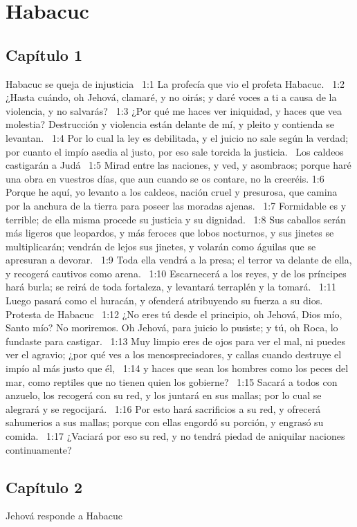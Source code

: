 \chapter{Habacuc}
\section*{Capítulo 1 }
Habacuc se queja de injusticia  
1:1 La profecía que vio el profeta Habacuc.  
1:2 ¿Hasta cuándo, oh Jehová, clamaré, y no oirás; y daré voces a ti a causa de la violencia, y no salvarás?  
1:3 ¿Por qué me haces ver iniquidad, y haces que vea molestia? Destrucción y violencia están delante de mí, y pleito y contienda se levantan.  
1:4 Por lo cual la ley es debilitada, y el juicio no sale según la verdad; por cuanto el impío asedia al justo, por eso sale torcida la justicia.  
Los caldeos castigarán a Judá  
1:5 Mirad entre las naciones, y ved, y asombraos; porque haré una obra en vuestros días, que aun cuando se os contare, no la creeréis. 
1:6 Porque he aquí, yo levanto a los caldeos, nación cruel y presurosa, que camina por la anchura de la tierra para poseer las moradas ajenas.  
1:7 Formidable es y terrible; de ella misma procede su justicia y su dignidad.  
1:8 Sus caballos serán más ligeros que leopardos, y más feroces que lobos nocturnos, y sus jinetes se multiplicarán; vendrán de lejos sus jinetes, y volarán como águilas que se apresuran a devorar.  
1:9 Toda ella vendrá a la presa; el terror va delante de ella, y recogerá cautivos como arena.  
1:10 Escarnecerá a los reyes, y de los príncipes hará burla; se reirá de toda fortaleza, y levantará terraplén y la tomará.  
1:11 Luego pasará como el huracán, y ofenderá atribuyendo su fuerza a su dios.  
Protesta de Habacuc  
1:12 ¿No eres tú desde el principio, oh Jehová, Dios mío, Santo mío? No moriremos. Oh Jehová, para juicio lo pusiste; y tú, oh Roca, lo fundaste para castigar.  
1:13 Muy limpio eres de ojos para ver el mal, ni puedes ver el agravio; ¿por qué ves a los menospreciadores, y callas cuando destruye el impío al más justo que él,  
1:14 y haces que sean los hombres como los peces del mar, como reptiles que no tienen quien los gobierne?  
1:15 Sacará a todos con anzuelo, los recogerá con su red, y los juntará en sus mallas; por lo cual se alegrará y se regocijará.  
1:16 Por esto hará sacrificios a su red, y ofrecerá sahumerios a sus mallas; porque con ellas engordó su porción, y engrasó su comida.  
1:17 ¿Vaciará por eso su red, y no tendrá piedad de aniquilar naciones continuamente?  
\section*{Capítulo 2 }
Jehová responde a Habacuc  

